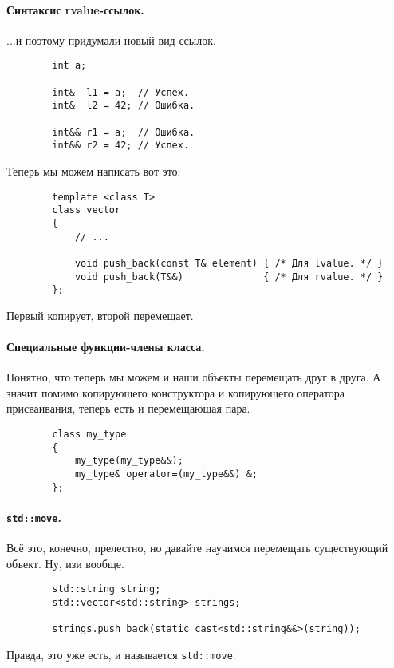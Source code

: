 \documentclass{article}
\begin{document}
    \paragraph{Синтаксис rvalue-ссылок.}
    ...и поэтому придумали новый вид ссылок.
    \begin{verbatim}
        int a;
        
        int&  l1 = a;  // Успех.
        int&  l2 = 42; // Ошибка.

        int&& r1 = a;  // Ошибка.
        int&& r2 = 42; // Успех.
    \end{verbatim}
    Теперь мы можем написать вот это:
    \begin{verbatim}
        template <class T>
        class vector
        {
            // ...

            void push_back(const T& element) { /* Для lvalue. */ }
            void push_back(T&&)              { /* Для rvalue. */ }
        };
    \end{verbatim}
    Первый копирует, второй перемещает.
    \paragraph{Специальные функции-члены класса.}
    Понятно, что теперь мы можем и наши объекты перемещать друг в друга. А значит помимо копирующего конструктора и копирующего оператора присваивания, теперь есть и перемещающая пара.
    \begin{verbatim}
        class my_type
        {
            my_type(my_type&&);
            my_type& operator=(my_type&&) &;
        };
    \end{verbatim}
    \paragraph{\texttt{std::move}.}
    Всё это, конечно, прелестно, но давайте научимся перемещать существующий объект. Ну, изи вообще.
    \begin{verbatim}
        std::string string;
        std::vector<std::string> strings;

        strings.push_back(static_cast<std::string&&>(string));
    \end{verbatim}
    Правда, это уже есть, и называется \texttt{std::move}.
\end{document}

